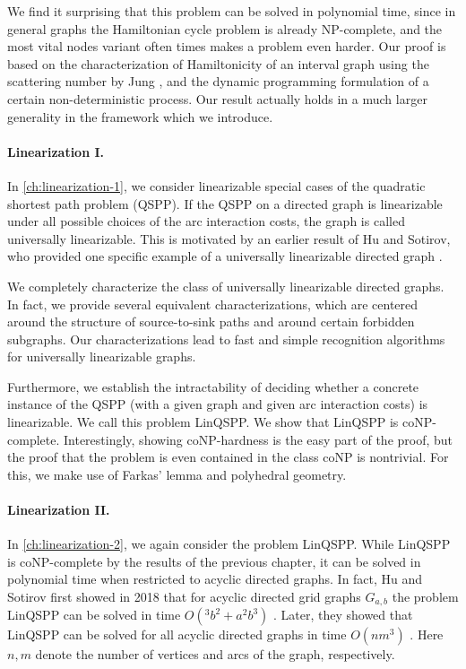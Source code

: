 We find it surprising that this problem can be solved in polynomial time, since in general graphs the Hamiltonian cycle problem is already NP-complete, and the most vital nodes variant often times makes a problem even harder. Our proof is based on the characterization of Hamiltonicity of an interval graph using the scattering number by Jung \cite{jung1978scat}, and the dynamic programming formulation of a certain non-deterministic process. Our result actually holds in a much larger generality in the framework which we introduce.

\paragraph*{Linearization I.}
In \cref{ch:linearization-1}, we consider linearizable special cases of the quadratic shortest path problem (QSPP). If the QSPP on a directed graph is linearizable under all possible choices of the arc interaction costs, the graph is called universally linearizable. This is motivated by an earlier result of Hu and Sotirov, who provided one specific example of a universally linearizable directed graph \cite{huSo2018}.

We completely characterize the class of universally linearizable directed graphs.
In fact, we provide several equivalent characterizations, which are centered around the structure of source-to-sink paths and around certain forbidden subgraphs. Our characterizations lead to fast and simple recognition algorithms for universally linearizable graphs. 

Furthermore, we establish the intractability of deciding whether a concrete instance of the QSPP (with a given graph and given arc interaction costs) is linearizable. We call this problem LinQSPP. We show that LinQSPP is coNP-complete. Interestingly, showing coNP-hardness is the easy part of the proof, but the proof that the problem is even contained in the class coNP is nontrivial. For this, we make use of Farkas' lemma \cite{Farkas1902} and polyhedral geometry.


\paragraph*{Linearization II.}
In \cref{ch:linearization-2}, we again consider the problem LinQSPP.
While LinQSPP is coNP-complete by the results of the previous chapter, it can be solved in polynomial time when restricted to acyclic directed graphs.
In fact, Hu and Sotirov first showed in 2018 that for acyclic directed grid graphs $G_{a,b}$ the problem LinQSPP can be solved in time $O(^3b^2 + a^2b^3)$ \cite{huSo2018}. Later, they showed that LinQSPP can be solved for all acyclic directed graphs in time $O(nm^3)$ \cite{huSo2021}. Here $n,m$ denote the number of vertices and arcs of the graph, respectively.

